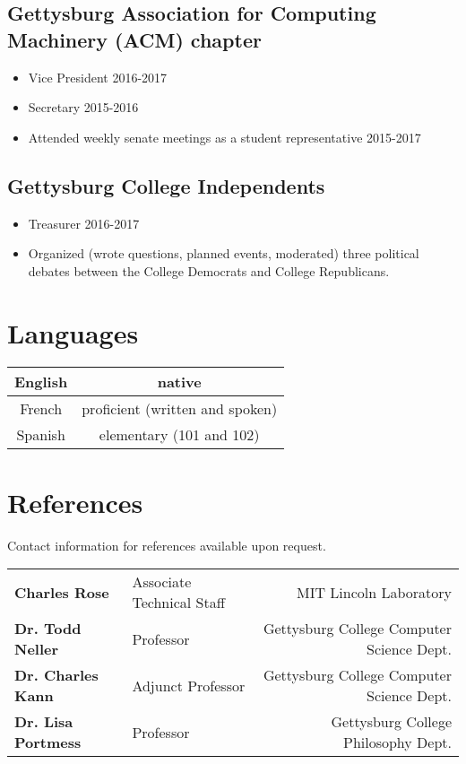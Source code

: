 \documentclass[11pt]{article}
\begin{document}
\subsection*{Gettysburg Association for Computing Machinery (ACM) chapter}
\begin{itemize}[noitemsep]
\item Vice President \hfill 2016-2017
\item Secretary \hfill 2015-2016
\item Attended weekly senate meetings as a student representative \hfill 2015-2017
\end{itemize}
 
\subsection*{Gettysburg College Independents}
\begin{itemize}[noitemsep]
	\item Treasurer \hfill 2016-2017
    \item Organized (wrote questions, planned events, moderated) three political debates between the College Democrats and College Republicans. 
\end{itemize}

\section*{Languages}
\begin{tabular}{ | c | c | }
	\hline
	English & native  \\ 
	\hline
	French & proficient (written and spoken) \\  
	\hline
	Spanish & elementary (101 and 102) \\
	\hline
\end{tabular}

\section*{References}
Contact information for references available upon request.\\

\begin{tabular}{ l l r }
  	\textbf{Charles Rose} & Associate Technical Staff & MIT Lincoln Laboratory \\
  	\textbf{Dr. Todd Neller} & Professor & Gettysburg College Computer Science Dept. \\
  	\textbf{Dr. Charles Kann} & Adjunct Professor & Gettysburg College Computer Science Dept. \\
  	\textbf{Dr. Lisa Portmess} & Professor & Gettysburg College Philosophy Dept. \\
\end{tabular}
\end{document}
